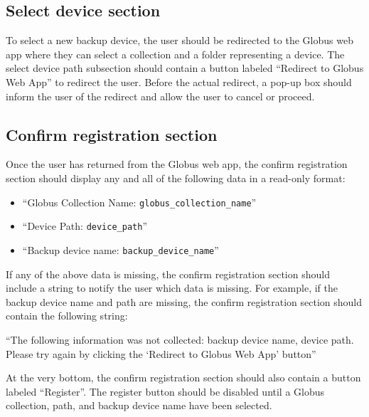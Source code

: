 
\subsection{Select device section}

\noindent To select a new backup device, the user should be redirected to the
Globus web app where they can select a collection and a folder representing a device. 
The select device path subsection should contain a button labeled ``Redirect to Globus Web App'' 
to redirect the user. Before the actual redirect, a pop-up box 
should inform the user of the redirect and allow the user to cancel or proceed. 
\subsection{Confirm registration section}

Once the user has returned from the Globus web app, the confirm registration section should 
display any and all of the following data in a read-only format:

\begin{itemize}\itemsep1pt
    \item ``Globus Collection Name: \texttt{globus\_collection\_name}''
    \item ``Device Path: \texttt{device\_path}''
    \item ``Backup device name: \texttt{backup\_device\_name}''
\end{itemize}

\noindent If any of the above data is missing, the confirm registration section should
include a string to notify the user which data is missing. For example, if the backup device
name and path are missing, the confirm registration section should contain the following string:

\vspace{3mm}
``The following information was not collected: backup device name, device path. Please try 
again by clicking the `Redirect to Globus Web App' button''
\vspace{3mm}

\noindent At the very bottom, the confirm registration section should also contain a button 
labeled ``Register''. The register button should be disabled until a Globus collection, path, 
and backup device name have been selected.

